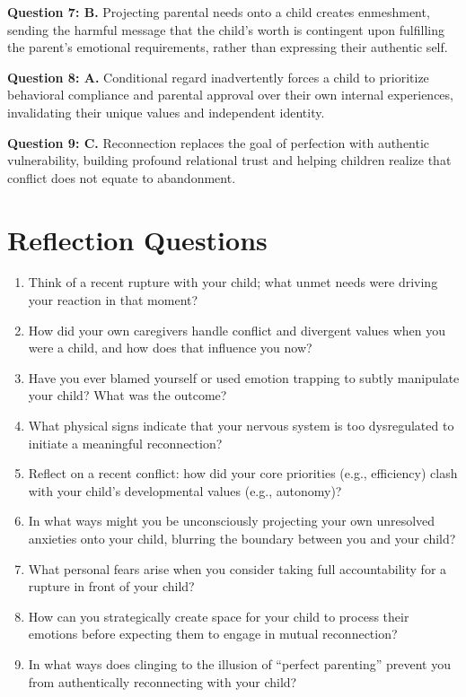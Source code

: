 \begin{practiceexercise}
\textbf{Question 7: B.} Projecting parental needs onto a child creates enmeshment, sending the harmful message that the child's worth is contingent upon fulfilling the parent's emotional requirements, rather than expressing their authentic self.
\vspace{\fill}

\textbf{Question 8: A.} Conditional regard inadvertently forces a child to prioritize behavioral compliance and parental approval over their own internal experiences, invalidating their unique values and independent identity.
\vspace{\fill}

\textbf{Question 9: C.} Reconnection replaces the goal of perfection with authentic vulnerability, building profound relational trust and helping children realize that conflict does not equate to abandonment.
\vspace{\fill}
\end{practiceexercise}

\newpage
\section{Reflection Questions}
\begin{reflection}
\small
\begin{enumerate}[itemsep=0pt, parsep=0pt, topsep=0pt]
  \item Think of a recent rupture with your child; what unmet needs were driving your reaction in that moment?
  \item How did your own caregivers handle conflict and divergent values when you were a child, and how does that influence you now?
  \item Have you ever blamed yourself or used emotion trapping to subtly manipulate your child? What was the outcome?
  \item What physical signs indicate that your nervous system is too dysregulated to initiate a meaningful reconnection?
  \item Reflect on a recent conflict: how did your core priorities (e.g., efficiency) clash with your child's developmental values (e.g., autonomy)?
  \item In what ways might you be unconsciously projecting your own unresolved anxieties onto your child, blurring the boundary between you and your child?
  \item What personal fears arise when you consider taking full accountability for a rupture in front of your child?
  \item How can you strategically create space for your child to process their emotions before expecting them to engage in mutual reconnection?
  \item In what ways does clinging to the illusion of ``perfect parenting'' prevent you from authentically reconnecting with your child?
\end{enumerate}
\end{reflection}